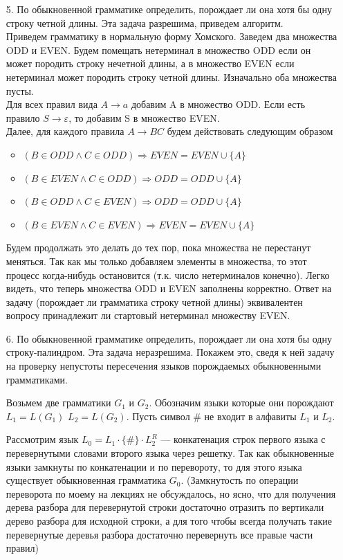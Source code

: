 \documentclass[12pt]{article}
\newcommand{\eps}{\varepsilon}
\newcommand{\dto}{\Rightarrow}
\begin{document}
\begin{enumerate}
	\item[5.] По обыкновенной грамматике определить, порождает ли она хотя бы одну строку четной длины. Эта задача разрешима, приведем алгоритм. \\
	Приведем грамматику в нормальную форму Хомского. Заведем два множества ODD и EVEN. Будем помещать нетерминал в множество ODD если он может породить строку нечетной длины, а в множество EVEN если нетерминал может породить строку четной длины. Изначально оба множества пусты. \\
	Для всех правил вида $A \to a$ добавим A в множество ODD. Если есть правило $S \to \eps$, то добавим S в множество EVEN. \\
	Далее, для каждого правила $A \to BC$ будем действовать следующим образом
	\begin{itemize}
		\item $(B \in ODD \land C \in ODD) \dto EVEN = EVEN \cup \{A\}$
		\item $(B \in EVEN \land C \in ODD) \dto ODD = ODD \cup \{A\}$
		\item $(B \in ODD \land C \in EVEN) \dto ODD = ODD \cup \{A\}$
		\item $(B \in EVEN \land C \in EVEN) \dto EVEN = EVEN \cup \{A\}$
	\end{itemize}
	
	Будем продолжать это делать до тех пор, пока множества не перестанут меняться. Так как мы только добавляем элементы в множества, то этот процесс когда-нибудь остановится (т.к. число нетерминалов конечно). Легко видеть, что теперь множества ODD и EVEN заполнены корректно. Ответ на задачу (порождает ли грамматика строку четной длины) эквивалентен вопросу принадлежит ли стартовый нетерминал множеству EVEN.
	
	\pagebreak
	
	\item[6.] По обыкновенной грамматике определить, порождает ли она хотя бы одну строку-палиндром. Эта задача неразрешима. Покажем это, сведя к ней задачу на проверку непустоты пересечения языков порождаемых обыкновенными грамматиками.
	
	Возьмем две грамматики $G_1$ и $G_2$. Обозначим языки которые они порождают $L_1 = L(G_1)$ $L_2 = L(G_2)$. Пусть символ $\#$ не входит в алфавиты $L_1$ и $L_2$. 
	
	Рассмотрим язык $L_0 = L_1 \cdot \{\#\} \cdot L^R_{2}$ --- конкатенация строк первого языка с перевернутыми словами второго языка через решетку. Так как обыкновенные языки замкнуты по конкатенации и по перевороту, то для этого языка существует обыкновенная грамматика $G_0$. (Замкнутость по операции переворота по моему на лекциях не обсуждалось, но ясно, что для получения дерева разбора для перевернутой строки достаточно отразить по вертикали дерево разбора для исходной строки, а для того чтобы всегда получать такие перевернутые деревья разбора достаточно перевернуть все правые части правил)
	

\end{enumerate}
\end{document}
